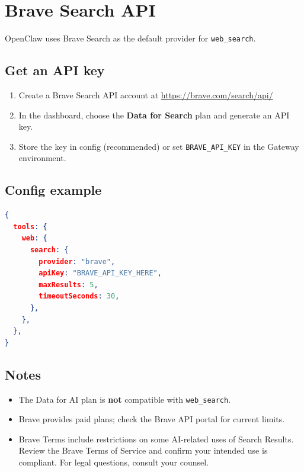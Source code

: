 \clearpage

\section{Brave Search API}


OpenClaw uses Brave Search as the default provider for \texttt{web\_search}.

\subsection{Get an API key}


\begin{enumerate}
  \item Create a Brave Search API account at \href{https://brave.com/search/api/}{https://brave.com/search/api/}
  \item In the dashboard, choose the \textbf{Data for Search} plan and generate an API key.
  \item Store the key in config (recommended) or set \texttt{BRAVE\_API\_KEY} in the Gateway environment.
\end{enumerate}


\subsection{Config example}


\begin{lstlisting}[language=json]
{
  tools: {
    web: {
      search: {
        provider: "brave",
        apiKey: "BRAVE_API_KEY_HERE",
        maxResults: 5,
        timeoutSeconds: 30,
      },
    },
  },
}
\end{lstlisting}


\subsection{Notes}


\begin{itemize}
  \item The Data for AI plan is \textbf{not} compatible with \texttt{web\_search}.
  \item Brave provides paid plans; check the Brave API portal for current limits.
  \item Brave Terms include restrictions on some AI-related uses of Search Results. Review the Brave Terms of Service and confirm your intended use is compliant. For legal questions, consult your counsel.
\end{itemize}



